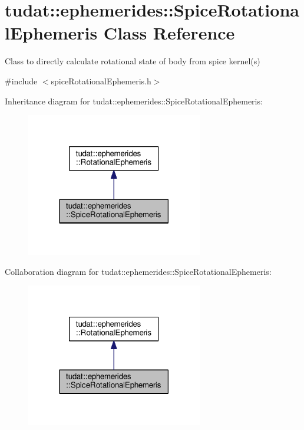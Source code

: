 \hypertarget{classtudat_1_1ephemerides_1_1SpiceRotationalEphemeris}{}\section{tudat\+:\+:ephemerides\+:\+:Spice\+Rotational\+Ephemeris Class Reference}
\label{classtudat_1_1ephemerides_1_1SpiceRotationalEphemeris}


Class to directly calculate rotational state of body from spice kernel(s)  




{\ttfamily \#include $<$spice\+Rotational\+Ephemeris.\+h$>$}



Inheritance diagram for tudat\+:\+:ephemerides\+:\+:Spice\+Rotational\+Ephemeris\+:
\nopagebreak
\begin{figure}[H]
\begin{center}
\leavevmode
\includegraphics[width=218pt]{classtudat_1_1ephemerides_1_1SpiceRotationalEphemeris__inherit__graph}
\end{center}
\end{figure}


Collaboration diagram for tudat\+:\+:ephemerides\+:\+:Spice\+Rotational\+Ephemeris\+:
\nopagebreak
\begin{figure}[H]
\begin{center}
\leavevmode
\includegraphics[width=218pt]{classtudat_1_1ephemerides_1_1SpiceRotationalEphemeris__coll__graph}
\end{center}
\end{figure}
